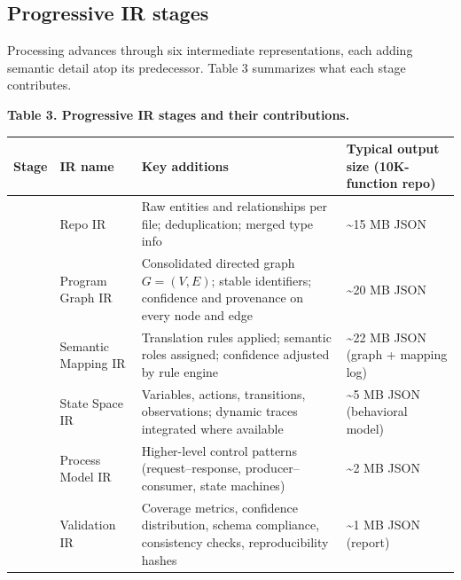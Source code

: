\documentclass[
]{article}
\newcounter{none} %
\begin{document}
\subsection{Progressive IR stages}\label{progressive-ir-stages}

Processing advances through six intermediate representations, each
adding semantic detail atop its predecessor. Table 3 summarizes what
each stage contributes.

\textbf{Table 3. Progressive IR stages and their contributions.}

{\def\LTcaptype{none} %
\begin{longtable}[]{@{}
  >{\raggedright\arraybackslash}p{}
  >{\raggedright\arraybackslash}p{}
  >{\raggedright\arraybackslash}p{}
  >{\raggedright\arraybackslash}p{}@{}}
\toprule\noalign{}
\begin{minipage}[b]{\linewidth}\raggedright
Stage
\end{minipage} & \begin{minipage}[b]{\linewidth}\raggedright
IR name
\end{minipage} & \begin{minipage}[b]{\linewidth}\raggedright
Key additions
\end{minipage} & \begin{minipage}[b]{\linewidth}\raggedright
Typical output size (10K-function repo)
\end{minipage} \\
\midrule\noalign{}
\endhead
\bottomrule\noalign{}
\endlastfoot
1 & Repo IR & Raw entities and relationships per file; deduplication;
merged type info & \textasciitilde15 MB JSON \\
2 & Program Graph IR & Consolidated directed graph \(G=(V,E)\); stable
identifiers; confidence and provenance on every node and edge &
\textasciitilde20 MB JSON \\
3 & Semantic Mapping IR & Translation rules applied; semantic roles
assigned; confidence adjusted by rule engine & \textasciitilde22 MB JSON
(graph + mapping log) \\
4 & State Space IR & Variables, actions, transitions, observations;
dynamic traces integrated where available & \textasciitilde5 MB JSON
(behavioral model) \\
5 & Process Model IR & Higher-level control patterns (request--response,
producer--consumer, state machines) & \textasciitilde2 MB JSON \\
6 & Validation IR & Coverage metrics, confidence distribution, schema
compliance, consistency checks, reproducibility hashes &
\textasciitilde1 MB JSON (report) \\
\end{longtable}
}
\end{document}
